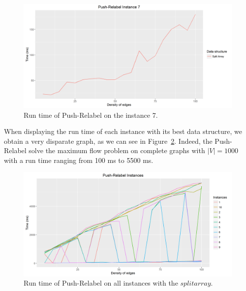 \begin{figure}[H]
\begin{center}
\includegraphics[scale=0.5]{images/pri7.png}
\caption{Run time of Push-Relabel on the instance 7.}
\label{fig:PR7}
\end{center}
\end{figure}
When displaying the run time of each instance with its best data structure, we obtain a very disparate graph, as we can see in Figure~\ref{fig:PRmean}. Indeed, the Push-Relabel solve the maximum flow problem on complete graphs with $|V|=1000$ with a run time ranging from 100 ms to 5500 ms.
\begin{figure}[H]
\begin{center}
\includegraphics[scale=0.5]{images/PRmean.png}
\caption{Run time of Push-Relabel on all instances with the $split array$.}
\label{fig:PRmean}
\end{center}
\end{figure}
